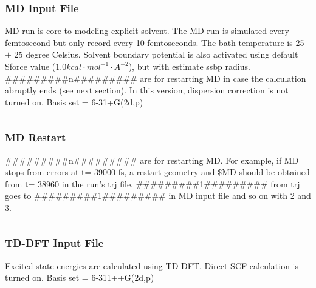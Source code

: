 \documentclass[
journal=jpcbfk, %
manuscript=article]{achemso}
\begin{document}
	\subsubsection{MD Input File}
	MD run is core to modeling explicit solvent. The MD run is simulated every femtosecond but only record every 10 femtoseconds. The bath temperature is 25 $\pm$ 25 degree Celsius. Solvent boundary potential is also activated using default Sforce value (\(1.0 kcal\cdot mol^{-1}\cdot A^{-2}\)), but with estimate ssbp radius. \#\#\#\#\#\#\#\#\#n\#\#\#\#\#\#\#\#\# are for restarting MD in case the calculation abruptly ends (see next section). In this version, dispersion correction is not turned on. Basis set = 6-31+G(2d,p)
	\inputminted[linenos, breaklines, baselinestretch=1, fontsize=\small]{Perl}{../GAMESSinpSample/MD_aniline32.inp}
	
	\subsubsection{MD Restart}
	\#\#\#\#\#\#\#\#\#n\#\#\#\#\#\#\#\#\# are for restarting MD. For example, if MD stops from errors at t= 39000 fs, a restart geometry and \$MD should be obtained from t= 38960 in the run's trj file. \#\#\#\#\#\#\#\#\#1\#\#\#\#\#\#\#\#\# from trj goes to \#\#\#\#\#\#\#\#\#1\#\#\#\#\#\#\#\#\# in MD input file and so on with 2 and 3.
	\inputminted[linenos, breaklines, baselinestretch=1, fontsize=\small]{Perl}{../GAMESSinpSample/MD_aniline32.trj}
	
	\subsubsection{TD-DFT Input File}
	Excited state energies are calculated using TD-DFT. Direct SCF calculation is turned on. Basis set = 6-311++G(2d,p)
	\inputminted[linenos, breaklines, baselinestretch=1, fontsize=\small]{Perl}{../GAMESSinpSample/TDDFT_aniline32_15010.inp}
	
	
\end{document}
